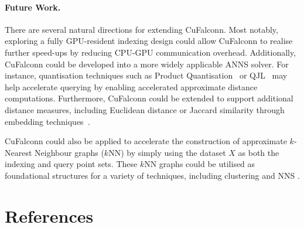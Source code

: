 \documentclass{article}
\newcommand{\cf}{CuFalconn\xspace}
\begin{document}
\paragraph{Future Work.}

There are several natural directions for extending \cf. Most notably, exploring a fully GPU-resident indexing design could allow \cf to realise further speed-ups by reducing CPU-GPU communication overhead. Additionally, \cf could be developed into a more widely applicable ANNS solver. For instance, quantisation techniques such as Product Quantisation~\cite{jegou2010product} or QJL~\cite{zandieh2025qjl} may help accelerate querying by enabling accelerated approximate distance computations. Furthermore, \cf could be extended to support additional distance measures, including Euclidean distance or Jaccard similarity through embedding techniques~\cite{rahimi2007random, vedaldi2010efficient}.

\cf could also be applied to accelerate the construction of approximate $k$-Nearest Neighbour graphs ($k$NN) by simply using the dataset $X$ as both the indexing and query point sets. These $k$NN graphs could be utilised as foundational structures for a variety of techniques, including clustering \cite{pham2025scalable} and NNS \cite{paredes2005using}.

\clearpage
\section{References}
\begingroup
\renewcommand{\section}[2]{} %


\endgroup
\end{document}
